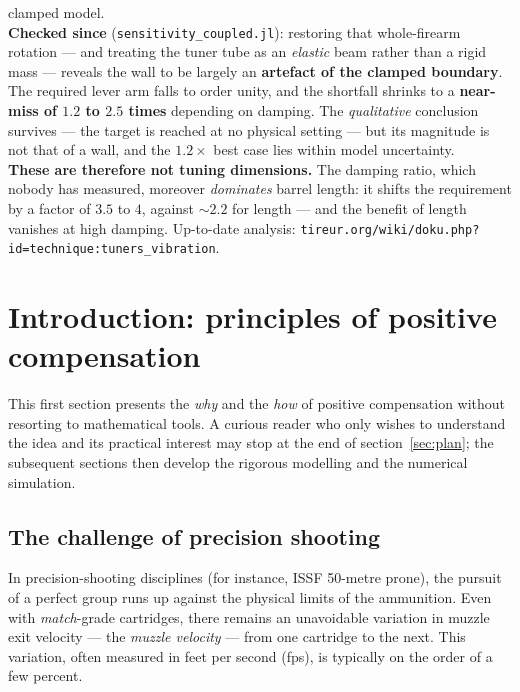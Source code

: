 \documentclass[12pt,a4paper]{article}
\begin{document}
\begin{center}
{{	clamped model.\\[3pt]
	\textbf{Checked since} (\texttt{sensitivity\_coupled.jl}): restoring that
	whole-firearm rotation --- and treating the tuner tube as an \emph{elastic}
	beam rather than a rigid mass --- reveals the wall to be largely an
	\textbf{artefact of the clamped boundary}. The required lever arm falls to
	order unity, and the shortfall shrinks to a \textbf{near-miss of $1.2$ to
	$2.5$ times} depending on damping. The \emph{qualitative} conclusion survives
	--- the target is reached at no physical setting --- but its magnitude is not
	that of a wall, and the $1.2\times$ best case lies within model uncertainty.\\[3pt]
	\textbf{These are therefore not tuning dimensions.} The damping ratio, which
	nobody has measured, moreover \emph{dominates} barrel length: it shifts the
	requirement by a factor of $3.5$ to $4$, against $\sim 2.2$ for length --- and
	the benefit of length vanishes at high damping. Up-to-date analysis:
	\texttt{tireur.org/wiki/doku.php?id=technique:tuners\_vibration}.}}
	\end{center}
	\vspace{1em}

	\tableofcontents
	\vspace{1cm}

	\section{Introduction: principles of positive compensation}
	\label{sec:intro}

	This first section presents the \emph{why} and the \emph{how} of positive compensation without resorting to mathematical tools. A curious reader who only wishes to understand the idea and its practical interest may stop at the end of section~\ref{sec:plan}; the subsequent sections then develop the rigorous modelling and the numerical simulation.

	\subsection{The challenge of precision shooting}

	In precision-shooting disciplines (for instance, ISSF 50-metre prone), the pursuit of a perfect group runs up against the physical limits of the ammunition. Even with \emph{match}-grade cartridges, there remains an unavoidable variation in muzzle exit velocity --- the \emph{muzzle velocity} --- from one cartridge to the next. This variation, often measured in feet per second (fps), is typically on the order of a few percent.
\end{document}
